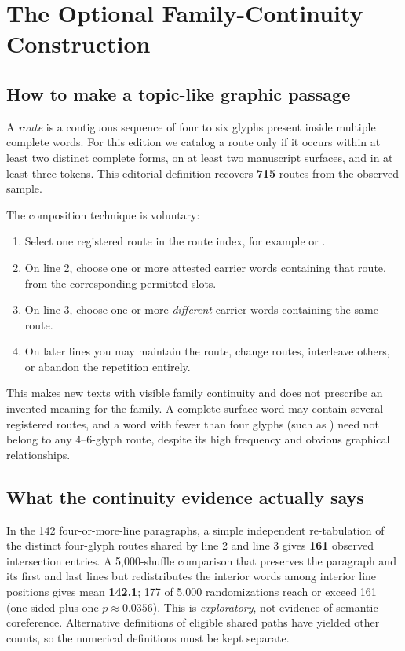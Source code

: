 \documentclass[11pt,a4paper]{article}
\newcommand{\EVA}[1]{{\ttfamily\detokenize{#1}}}
\begin{document}
\section{The Optional Family-Continuity Construction}
\subsection{How to make a topic-like graphic passage}
A \emph{route} is a contiguous sequence of four to six glyphs present inside multiple complete words. For this edition we catalog a route only if it occurs within at least two distinct complete forms, on at least two manuscript surfaces, and in at least three tokens. This editorial definition recovers \textbf{715} routes from the observed sample.

The composition technique is voluntary:
\begin{enumerate}
\item Select one registered route in the route index, for example \EVA{q.o.t.ch} or \EVA{a.i.i.n}.
\item On line 2, choose one or more attested carrier words containing that route, from the corresponding permitted slots.
\item On line 3, choose one or more \emph{different} carrier words containing the same route.
\item On later lines you may maintain the route, change routes, interleave others, or abandon the repetition entirely.
\end{enumerate}

This makes new texts with visible family continuity and does not prescribe an invented meaning for the family. A complete surface word may contain several registered routes, and a word with fewer than four glyphs (such as \EVA{chol}) need not belong to any 4--6-glyph route, despite its high frequency and obvious graphical relationships.

\subsection{What the continuity evidence actually says}
In the 142 four-or-more-line paragraphs, a simple independent re-tabulation of the distinct four-glyph routes shared by line 2 and line 3 gives \textbf{161} observed intersection entries. A 5,000-shuffle comparison that preserves the paragraph and its first and last lines but redistributes the interior words among interior line positions gives mean \textbf{142.1}; 177 of 5,000 randomizations reach or exceed 161 (one-sided plus-one $p\approx0.0356$). This is \emph{exploratory}, not evidence of semantic coreference. Alternative definitions of eligible shared paths have yielded other counts, so the numerical definitions must be kept separate.
\end{document}
